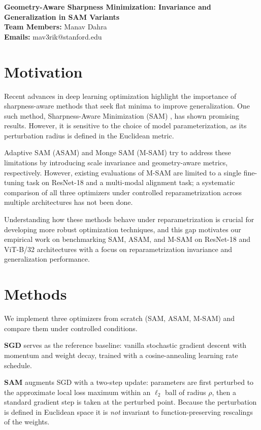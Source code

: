\documentclass{article}
\makeatletter
\renewcommand{\maketitle}{
  \begin{center}
    {\bf \large Geometry-Aware Sharpness Minimization: Invariance and Generalization in SAM Variants}\\
    \vspace{0.1cm}
    {\bf Team Members:} Manav Dahra\\
    \vspace{0.1cm}
    {\bf Emails:} mav3rik@stanford.edu\\
    \vspace{0.2cm}
  \end{center}
}
\makeatother
\begin{document}
\maketitle

\section{Motivation}
Recent advances in deep learning optimization highlight the importance of sharpness-aware methods that seek flat minima to improve generalization. One such method, Sharpness-Aware Minimization (SAM) \citep{foret2021sam}, has shown promising results. However, it is sensitive to the choice of model parameterization, as its perturbation radius is defined in the Euclidean metric.

Adaptive SAM (ASAM) \citep{kwon2021asam} and Monge SAM (M-SAM) \citep{jacobsen2025msam} try to address these limitations by introducing scale invariance and geometry-aware metrics, respectively. However, existing evaluations of M-SAM are limited to a single fine-tuning task on ResNet-18 and a multi-modal alignment task; a systematic comparison of all three optimizers under controlled reparametrization across multiple architectures has not been done. 

Understanding how these methods behave under reparametrization is crucial for developing more robust optimization techniques, and this gap motivates our empirical work on benchmarking SAM, ASAM, and M-SAM on ResNet-18 and ViT-B/32 architectures with a focus on reparametrization invariance and generalization performance.

\section{Methods}

We implement three optimizers from scratch (SAM, ASAM, M-SAM) and compare them under controlled conditions.

\textbf{SGD} serves as the reference baseline: vanilla stochastic gradient descent with momentum and weight decay, trained with a cosine-annealing learning rate schedule.

\textbf{SAM} \citep{foret2021sam} augments SGD with a two-step update: parameters are first perturbed to the approximate local loss maximum within an $\ell_2$ ball of radius $\rho$, then a standard gradient step is taken at the perturbed point. Because the perturbation is defined in Euclidean space it is \emph{not} invariant to function-preserving rescalings of the weights.
\end{document}

